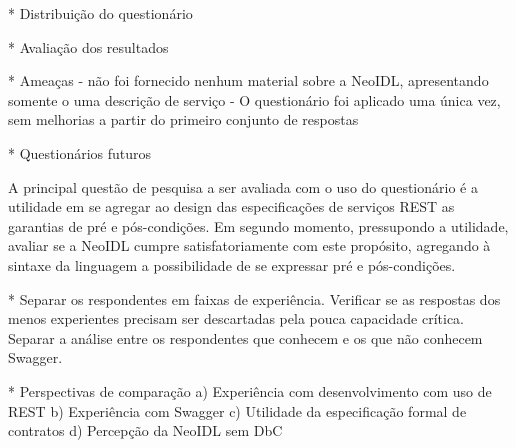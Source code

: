 * Distribuição do questionário

* Avaliação dos resultados

* Ameaças
- não foi fornecido nenhum material sobre a NeoIDL, apresentando somente o uma
descrição de serviço
- O questionário foi aplicado uma única vez, sem melhorias a partir do primeiro
conjunto de respostas


* Questionários futuros

A principal questão de pesquisa a ser avaliada com o uso do questionário é a utilidade em se agregar ao design das especificações de serviços REST as garantias de pré e
pós-condições. Em segundo momento, pressupondo a utilidade, avaliar se a NeoIDL
cumpre satisfatoriamente com este propósito, agregando à sintaxe da linguagem
a possibilidade de se expressar pré e pós-condições.

* Separar os respondentes em faixas de experiência. Verificar se as respostas
dos menos experientes precisam ser descartadas pela pouca capacidade crítica.
Separar a análise entre os respondentes que conhecem e os que não conhecem
Swagger.

* Perspectivas de comparação
a) Experiência com desenvolvimento com uso de REST
b) Experiência com Swagger
c) Utilidade da especificação formal de contratos
d) Percepção da NeoIDL sem DbC





